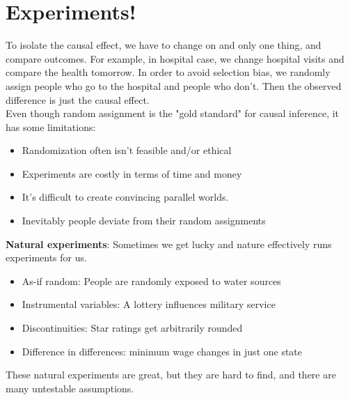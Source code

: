 \section{Experiments!}
To isolate the causal effect, we have to change on and only one thing, and compare outcomes. For example, in hospital case, we change hospital visits and compare the health tomorrow. In order to avoid selection bias, we randomly assign people who go to the hospital and people who don't. Then the observed difference is just the causal effect. \\
Even though random assignment is the "gold standard" for causal inference, it has some limitations:
\begin{itemize}
\item Randomization often isn't feasible and/or ethical
\item Experiments are costly in terms of time and money
\item It's difficult to create convincing parallel worlds.
\item Inevitably people deviate from their random assignments
\end{itemize}
\textbf{Natural experiments}: Sometimes we get lucky and nature effectively runs experiments for us. 
\begin{itemize}
\item As-if random: People are randomly exposed to water sources
\item Instrumental variables: A lottery influences military service
\item Discontinuities: Star ratings get arbitrarily rounded
\item Difference in differences: minimum wage changes in just one state
\end{itemize}
These natural experiments are great, but they are hard to find, and there are many untestable assumptions.

